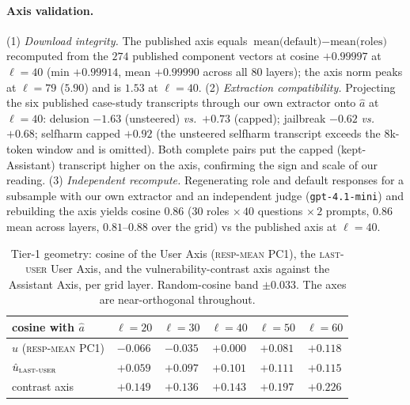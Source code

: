 \documentclass{article}
\newcommand{\respmean}{\textsc{resp-mean}}
\newcommand{\lastuser}{\textsc{last-user}}
\newcommand{\vs}{\emph{vs.}\ }
\newcommand{\recomputeval}{$0.86$ ($30$ roles $\times\,40$ questions $\times\,2$ prompts, $0.86$ mean across layers, $0.81$--$0.88$ over the grid)}
\begin{document}
\paragraph{Axis validation.} (1) \emph{Download integrity.} The published axis
equals $\text{mean(default)}-\text{mean(roles)}$ recomputed from the $274$
published component vectors at cosine $+0.99997$ at $\ell{=}40$ (min $+0.99914$,
mean $+0.99990$ across all $80$ layers); the axis norm peaks at $\ell{=}79$
($5.90$) and is $1.53$ at $\ell{=}40$. (2) \emph{Extraction compatibility.}
Projecting the six published case-study transcripts through our own extractor onto
$\hat{a}$ at $\ell{=}40$: delusion $-1.63$ (unsteered) \vs $+0.73$ (capped);
jailbreak $-0.62$ \vs $+0.68$; selfharm capped $+0.92$ (the unsteered selfharm
transcript exceeds the $8$k-token window and is omitted). Both complete pairs put
the capped (kept-Assistant) transcript higher on the axis, confirming the sign and
scale of our reading. (3) \emph{Independent recompute.} Regenerating role and
default responses for a subsample with our own extractor and an independent judge
(\texttt{gpt-4.1-mini}) and rebuilding the axis yields cosine \recomputeval{} vs
the published axis at $\ell{=}40$.

\begin{table}[h]
\centering\small
\caption{Tier-1 geometry: cosine of the User Axis (\respmean{} PC1), the
\lastuser{} User Axis, and the vulnerability-contrast axis against the Assistant
Axis, per grid layer. Random-cosine band $\pm 0.033$. The axes are near-orthogonal
throughout.}
\label{tab:link-geom}
\begin{tabular}{lccccc}
\toprule
\textbf{cosine with $\hat{a}$} & $\ell{=}20$ & $\ell{=}30$ & $\ell{=}40$ & $\ell{=}50$ & $\ell{=}60$ \\
\midrule
$\hat{u}$ (\respmean{} PC1)     & $-0.066$ & $-0.035$ & $+0.000$ & $+0.081$ & $+0.118$ \\
$\hat{u}_{\lastuser}$           & $+0.059$ & $+0.097$ & $+0.101$ & $+0.111$ & $+0.115$ \\
contrast axis                   & $+0.149$ & $+0.136$ & $+0.143$ & $+0.197$ & $+0.226$ \\
\bottomrule
\end{tabular}
\end{table}
\end{document}
